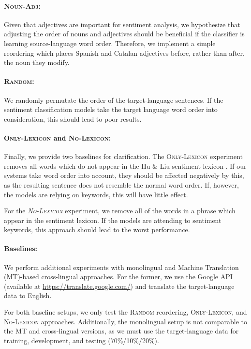 \documentclass[a4paper,11pt,twocolumn,twoside]{article}
\newcommand{\nadj}{\textsc{Noun-Adj}\xspace}
\newcommand{\random}{\textsc{Random}\xspace}
\newcommand{\onlylex}{\textsc{Only-Lexicon}\xspace}
\newcommand{\nolex}{\textsc{No-Lexicon}\xspace}
\begin{document}
\paragraph{\nadj: }Given that adjectives are important for sentiment analysis, we hypothesize that adjusting the order of nouns and adjectives should be beneficial if the classifier is learning source-language word order. Therefore, we implement a simple reordering which places Spanish and Catalan adjectives before, rather than after, the noun they modify.

\paragraph{\random: }We randomly permutate the order of the target-language sentences. If the sentiment classification models take the target language word order into consideration, this should lead to poor results.

\paragraph{\onlylex and \nolex: }Finally, we provide two baselines for clarification. The \onlylex experiment removes all words which do
not appear in the Hu \& Liu sentiment lexicon \cite{HuandLiu2004}. If our systems
take word order into account, they should be affected negatively by this, as the
resulting sentence does not resemble the normal word order. If, however, the models
are relying on keywords, this will have little effect.

For the \emph{\nolex} experiment, we remove all of the words
in a phrase which appear in the sentiment lexicon. If the models are attending to
sentiment keywords, this approach should lead to the worst performance. 

\paragraph{Baselines: }We perform additional experiments with monolingual and Machine Translation (MT)-based cross-lingual approaches. For the former, we use the Google API (available at \url{https://translate.google.com/}) and translate the target-language data to English. 

For both baseline setups, we only test the \random reordering, \onlylex, and \nolex approaches. Additionally, the monolingual setup is not comparable to the MT and cross-lingual versions, as we must use the target-language data for training, development, and testing (70\%/10\%/20\%).
\end{document}
